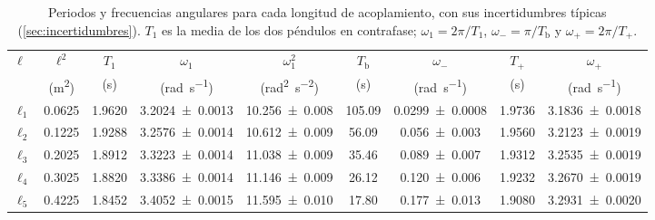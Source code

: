 
\begin{table}[ht]
\centering
\caption{Periodos y frecuencias angulares para cada longitud de acoplamiento, con sus incertidumbres típicas (\cref{sec:incertidumbres}). $T_1$ es la media de los dos péndulos en contrafase; $\omega_1=2\pi/T_1$, $\omega_{-}=\pi/T_{\mathrm{b}}$ y $\omega_{+}=2\pi/T_{+}$.}
\label{tab:frecuencias}
\renewcommand{\arraystretch}{1.25}\setlength{\tabcolsep}{3.6pt}\small
\begin{tabular}{@{}l c c c c c c c c@{}}
\toprule
$\ell$ & $\ell^{2}$ & $T_1$ & $\omega_1$ & $\omega_1^{2}$ & $T_{\mathrm{b}}$ & $\omega_{-}$ & $T_{+}$ & $\omega_{+}$ \\
 & (\si{\meter\squared}) & (\si{\second}) & (\si{\radian\per\second}) & (\si{\radian\squared\per\second\squared}) & (\si{\second}) & (\si{\radian\per\second}) & (\si{\second}) & (\si{\radian\per\second}) \\
\midrule
$\ell_{1}$ & \num{0.0625} & \num{1.9620} & \num{3.2024 \pm 0.0013} & \num{10.256 \pm 0.008} & \num{105.09} & \num{0.0299 \pm 0.0008} & \num{1.9736} & \num{3.1836 \pm 0.0018} \\
$\ell_{2}$ & \num{0.1225} & \num{1.9288} & \num{3.2576 \pm 0.0014} & \num{10.612 \pm 0.009} & \num{56.09} & \num{0.056 \pm 0.003} & \num{1.9560} & \num{3.2123 \pm 0.0019} \\
$\ell_{3}$ & \num{0.2025} & \num{1.8912} & \num{3.3223 \pm 0.0014} & \num{11.038 \pm 0.009} & \num{35.46} & \num{0.089 \pm 0.007} & \num{1.9312} & \num{3.2535 \pm 0.0019} \\
$\ell_{4}$ & \num{0.3025} & \num{1.8820} & \num{3.3386 \pm 0.0014} & \num{11.146 \pm 0.009} & \num{26.12} & \num{0.120 \pm 0.006} & \num{1.9232} & \num{3.2670 \pm 0.0019} \\
$\ell_{5}$ & \num{0.4225} & \num{1.8452} & \num{3.4052 \pm 0.0015} & \num{11.595 \pm 0.010} & \num{17.80} & \num{0.177 \pm 0.013} & \num{1.9080} & \num{3.2931 \pm 0.0020} \\
\bottomrule
\end{tabular}
\end{table}
